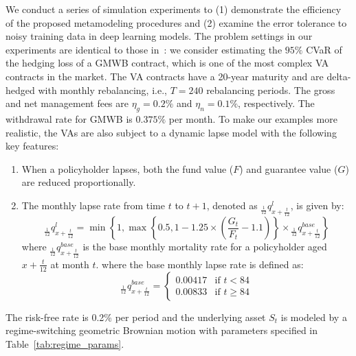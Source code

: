We conduct a series of simulation experiments to (1) demonstrate the efficiency of the proposed metamodeling procedures and (2) examine the error tolerance to noisy training data in deep learning models.
The problem settings in our experiments are identical to those in~\cite{dang2020efficient}:
we consider estimating the $95\%$ CVaR of the hedging loss of a GMWB contract, which is one of the most complex VA contracts in the market.
The VA contracts have a 20-year maturity and are delta-hedged with monthly rebalancing, i.e., $T=240$ rebalancing periods.
The gross and net management fees are $\eta_g = 0.2\%$ and $\eta_n=0.1\%$, respectively.
The withdrawal rate for GMWB is $0.375\%$ per month.
To make our examples more realistic, the VAs are also subject to a dynamic lapse model with the following key features:
\begin{enumerate}
    \item When a policyholder lapses, both the fund value ($F$) and guarantee value ($G$) are reduced proportionally.
    \item The monthly lapse rate from time $t$ to $t + 1$, denoted as ${}_{\frac{1}{12}}q^l_{x+\frac{t}{12}}$, is given by:
    \begin{equation}
        {}_{\frac{1}{12}}q^l_{x+\frac{t}{12}} = \min\left\{1, \max\left\{0.5, 1 - 1.25 \times \left(\frac{G_t}{F_t} - 1.1\right)\right\} \times {}_{\frac{1}{12}}q^{base}_{x+\frac{t}{12}}\right\}
    \end{equation}
    where ${}_{\frac{1}{12}}q^{base}_{x+\frac{t}{12}}$ is the base monthly mortality rate for a policyholder aged $x + \frac{t}{12}$ at month $t$.
    where the base monthly lapse rate is defined as:
    \begin{equation}
        {}_{\frac{1}{12}}q^{base}_{x+\frac{t}{12}} = 
        \begin{cases}
            0.00417 & \text{if } t < 84 \\
            0.00833 & \text{if } t \geq 84
        \end{cases}
    \end{equation}
\end{enumerate}

The risk-free rate is 0.2\% per period and the underlying asset $S_t$ is modeled by a regime-switching geometric Brownian motion with parameters specified in Table~\ref{tab:regime_params}.

